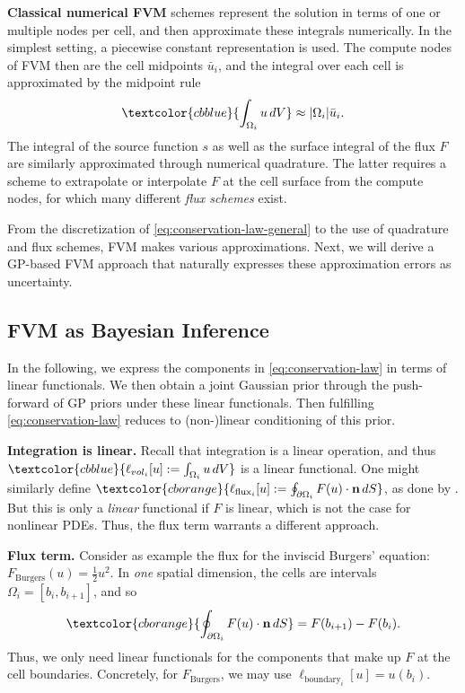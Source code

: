 \documentclass{article}
\theoremstyle{plain}
\theoremstyle{definition}
\theoremstyle{remark}
\newcommand{\termaccum}[1]{\textcolor{cbblue}{#1}}
\newcommand{\termflux}[1]{\textcolor{cborange}{#1}}
\newcommand{\termsource}[1]{\textcolor{cbteal}{#1}}
\begin{document}
\textbf{Classical numerical FVM} schemes represent the solution in terms of one or multiple nodes per cell, and then approximate these integrals numerically.
In the simplest setting, a piecewise constant representation is used.
The compute nodes of FVM then are the cell midpoints $\bar{u}_i$, and the \termaccum{integral over each cell} is approximated by the midpoint rule
\begin{equation}
  \termaccum{\int_{\Omega_i} u \, dV} \approx \lvert \Omega_i \rvert \bar{u}_i .
\end{equation}
\termsource{The integral of the source function $s$} as well as the \termflux{surface integral of the flux $F$} are similarly approximated through numerical quadrature.
The latter requires a scheme to extrapolate or interpolate $F$ at the cell surface from the compute nodes, for which many different \textit{flux schemes} exist.

From the discretization of \cref{eq:conservation-law-general} to the use of quadrature and flux schemes, FVM makes various approximations.
Next, we will derive a GP-based FVM approach that naturally expresses these approximation errors as uncertainty.

\subsection{FVM as Bayesian Inference}
\label{sec:gp-fvm}

In the following, we express the components in \cref{eq:conservation-law} in terms of linear functionals.
We then obtain a joint Gaussian prior through the push-forward of GP priors under these linear functionals.
Then fulfilling \cref{eq:conservation-law} reduces to (non-)linear conditioning of this prior.

\textbf{Integration is linear.} Recall that integration is a linear operation, and thus $\termaccum{\ell_{vol_i}[u] := \int_{\Omega_i} u \, dV}$ is a linear functional.
One might similarly define $\termflux{\ell_{\text{flux}_i}[u] := \oint_{\partial\Omega_i} F(u) \cdot \mathbf{n} \, dS}$, as done by \citet{weilandScalingProbabilisticPDE2024}.
But this is only a \textit{linear} functional if $F$ is linear, which is not the case for nonlinear PDEs.
Thus, the flux term warrants a different approach.

\textbf{Flux term.} Consider as example the flux for the inviscid Burgers' equation: $F_{\text{Burgers}}(u) = \frac{1}{2} u^2$.
In \emph{one} spatial dimension, the cells are intervals $\Omega_i = [b_i, b_{i+1}]$, and so
\begin{equation*}
  \termflux{\oint_{\partial\Omega_i} F(u) \cdot \mathbf{n} \, dS} = F(b_{i+1}) - F(b_i) .
\end{equation*}
Thus, we only need linear functionals for the components that make up $F$ at the cell boundaries.
Concretely, for $F_{\text{Burgers}}$, we may use $\ell_{\text{boundary}_i}[u] = u(b_i)$.
\end{document}
